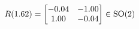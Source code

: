 \documentclass[preview]{standalone}
\begin{document}
\begin{align*}
\special{dvisvgm:raw <g id='unique000'>}R(1.62) = \begin{bmatrix} -0.04 & -1.00 \\ 1.00 & -0.04 \end{bmatrix} \in \text{SO}(2)\special{dvisvgm:raw </g>}
\end{align*}
\end{document}
